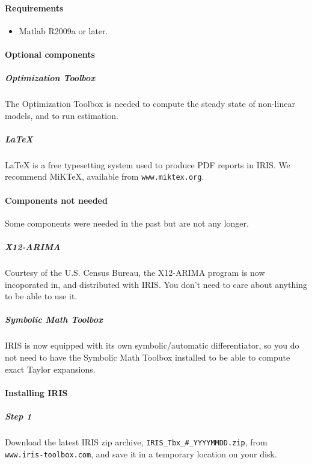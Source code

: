 

	\paragraph{Requirements}
 
 \begin{itemize}
 \item
   Matlab R2009a or later.
 \end{itemize}
 
 \paragraph{Optional components}
 
 \subparagraph{Optimization Toolbox}
 
 The Optimization Toolbox is needed to compute the steady state of
 non-linear models, and to run estimation.
 
 \subparagraph{LaTeX}
 
 LaTeX is a free typesetting system used to produce PDF reports in IRIS.
 We recommend MiKTeX, available from \texttt{www.miktex.org}.
 
 \paragraph{Components not needed}
 
 Some components were needed in the past but are not any longer.
 
 \subparagraph{X12-ARIMA}
 
 Courtesy of the U.S. Census Bureau, the X12-ARIMA program is now
 incoporated in, and distributed with IRIS. You don't need to care about
 anything to be able to use it.
 
 \subparagraph{Symbolic Math Toolbox}
 
 IRIS is now equipped with its own symbolic/automatic differentiator, so
 you do not need to have the Symbolic Math Toolbox installed to be able
 to compute exact Taylor expansions.
 
 \paragraph{Installing IRIS}
 
 \subparagraph{Step 1}
 
 Download the latest IRIS zip archive,
 \texttt{IRIS\_Tbx\_\#\_YYYYMMDD.zip}, from
 \texttt{www.iris-toolbox.com}, and save it in a temporary location on
 your disk.
 
